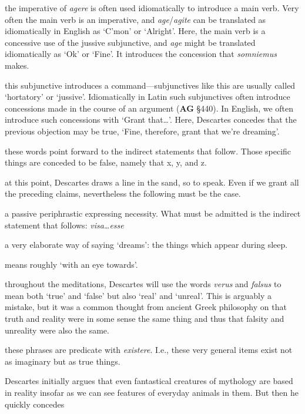  the imperative of \textit{agere} is often used idiomatically to introduce a main verb. Very often the main verb is an imperative, and \textit{age}/\textit{agite} can be translated as idiomatically in English as `C'mon' or `Alright'. Here, the main verb is a concessive use of the jussive subjunctive, and \textit{age} might be translated idiomatically as `Ok' or `Fine'. It introduces the concession that \textit{somniemus} makes.

 this subjunctive introduces a command---subjunctives like this are usually called `hortatory' or `jussive'. Idiomatically in Latin such subjunctives often introduce concessions made in the course of an argument (\textbf{AG} §440). In English, we often introduce such concessions with `Grant that\dots'. Here, Descartes concedes that the previous objection may be true, `Fine, therefore, grant that we're dreaming'.

 these words point forward to the indirect statements that follow. Those specific things are conceded to be false, namely that x, y, and z.

 at this point, Descartes draws a line in the sand, so to speak. Even if we grant all the preceding claims, nevertheless the following must be the case.

 a passive periphrastic expressing necessity. What must be admitted is the indirect statement that follows: \textit{visa\dots esse}

 a very elaborate way of saying `dreams': the things which appear during sleep.

 means roughly `with an eye towards'.

 throughout the meditations, Descartes will use the words \textit{verus} and \textit{falsus} to mean both `true' and `false' but also `real' and `unreal'. This is arguably a mistake, but it was a common thought from ancient Greek philosophy on that truth and reality were in some sense the same thing and thus that falsity and unreality were also the same.

 these phrases are predicate with \textit{existere}. I.e., these very general items exist not as imaginary but as true things.

 Descartes initially argues that even fantastical creatures of mythology are based in reality insofar as we can see features of everyday animals in them. But then he quickly concedes 

